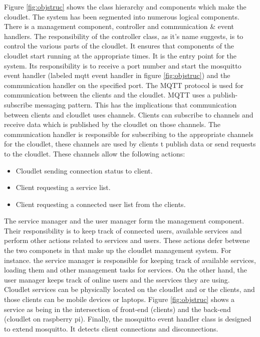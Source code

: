 Figure \ref{fig:objstruc} shows the class hierarchy and components which make the cloudlet. The system has been segmented into numerous logical components. There is a management component, controller and communication \& event handlers. The responsibility of the controller class, as it's name suggests, is to control the various parts of the cloudlet. It ensures that components of the cloudlet start running at the appropriate times. It is the entry point for the system. Its responsibility is to receive a port number and start the mosquitto event handler (labeled mqtt event handler in figure \ref{fig:objstruc}) and the communication handler on the specified port. The MQTT protocol is used for communication between the clients and the cloudlet. MQTT uses a publish-subscribe messaging pattern. This has the implications that communication between clients and cloudlet uses channels. Clients can subscribe to channels and receive data which is published by the cloudlet on those channels. The communication handler is responsible for subscribing to the appropriate channels for the cloudlet, these channels are used by clients t publish data or send requests to the cloudlet. These channels allow the following actions:
\begin{itemize}
\item Cloudlet sending connection status to client.
\item Client requesting a service list.
\item Client requesting a connected user list from the clients.
\end{itemize}
The service manager and the user manager form the management component. Their responsibility is to keep track of connected users, available services and perform other actions related to services and users. These actions defer betwene the two componets in that make up the cloudlet management system. For instance. the service manager is responsible for keeping track of available services, loading them and other management tasks for services. On the other hand, the user manager keeps track of online users and the sservices they are using. Cloudlet services can be physically located on the cloudlet and or the clients, and those clients can be mobile devices or laptops. Figure \ref{fig:objstruc} shows a service as being in the intersection of front-end (clients) and the back-end (cloudlet on raspberry pi). Finally, the mosquitto event handler class is designed to extend mosquitto.  It detects client connections and disconnections.

